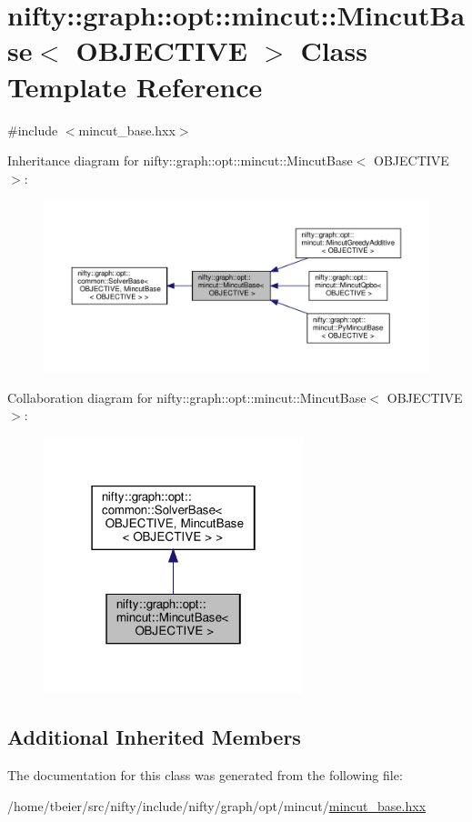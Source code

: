 \hypertarget{classnifty_1_1graph_1_1opt_1_1mincut_1_1MincutBase}{}\section{nifty\+:\+:graph\+:\+:opt\+:\+:mincut\+:\+:Mincut\+Base$<$ O\+B\+J\+E\+C\+T\+I\+VE $>$ Class Template Reference}
\label{classnifty_1_1graph_1_1opt_1_1mincut_1_1MincutBase}


{\ttfamily \#include $<$mincut\+\_\+base.\+hxx$>$}



Inheritance diagram for nifty\+:\+:graph\+:\+:opt\+:\+:mincut\+:\+:Mincut\+Base$<$ O\+B\+J\+E\+C\+T\+I\+VE $>$\+:
\nopagebreak
\begin{figure}[H]
\begin{center}
\leavevmode
\includegraphics[width=350pt]{classnifty_1_1graph_1_1opt_1_1mincut_1_1MincutBase__inherit__graph}
\end{center}
\end{figure}


Collaboration diagram for nifty\+:\+:graph\+:\+:opt\+:\+:mincut\+:\+:Mincut\+Base$<$ O\+B\+J\+E\+C\+T\+I\+VE $>$\+:
\nopagebreak
\begin{figure}[H]
\begin{center}
\leavevmode
\includegraphics[width=214pt]{classnifty_1_1graph_1_1opt_1_1mincut_1_1MincutBase__coll__graph}
\end{center}
\end{figure}
\subsection*{Additional Inherited Members}


The documentation for this class was generated from the following file\+:\begin{DoxyCompactItemize}
\item 
/home/tbeier/src/nifty/include/nifty/graph/opt/mincut/\hyperlink{mincut__base_8hxx}{mincut\+\_\+base.\+hxx}\end{DoxyCompactItemize}
